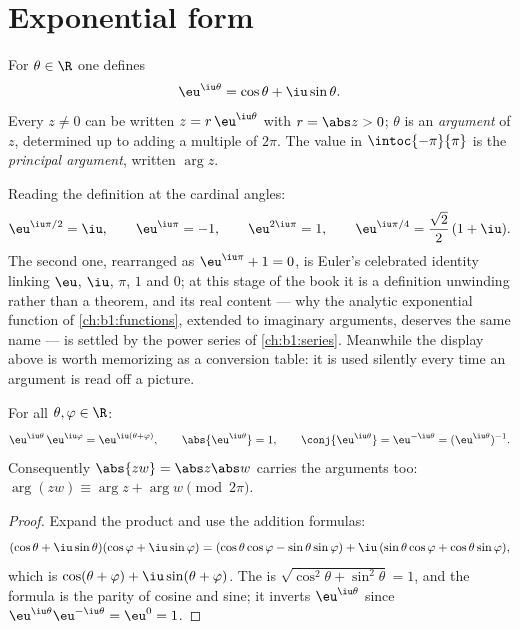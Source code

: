 \section{Exponential form}

\begin{definition}\label{def:b1:complex:expi}
For $\theta \in \R$ one defines
\[
\eu^{\iu\theta} = \cos\theta + \iu \sin\theta .
\]
Every $z \neq 0$ can be written $z = r\,\eu^{\iu\theta}$ with $r =
\abs z > 0$; $\theta$ is an \emph{argument} of $z$,
determined up to adding a multiple of $2\pi$. The value in
$\intoc{-\pi}{\pi}$ is the \emph{principal argument}, written
$\arg z$.
\end{definition}

\begin{example}\label{ex:b1:complex:eulerid}
Reading the definition at the cardinal angles:
\[
\eu^{\iu\pi/2} = \iu, \qquad
\eu^{\iu\pi} = -1, \qquad
\eu^{2\iu\pi} = 1, \qquad
\eu^{\iu\pi/4} = \frac{\sqrt2}2\,(1 + \iu) .
\]
The second one, rearranged as $\eu^{\iu\pi} + 1 = 0$, is Euler's
celebrated identity linking $\eu$, $\iu$, $\pi$, $1$ and $0$; at
this stage of the book it is a definition unwinding rather than a
theorem, and its real content --- why the analytic exponential
function of \cref{ch:b1:functions}, extended to imaginary
arguments, deserves the same name --- is settled by the power
series of \cref{ch:b1:series}. Meanwhile the display above is
worth memorizing as a conversion table: it is used silently every
time an argument is read off a picture.
\end{example}

\begin{theorem}\label{thm:b1:complex:funceq}
For all $\theta, \varphi \in \R$:
\[
\eu^{\iu\theta}\, \eu^{\iu\varphi} = \eu^{\iu(\theta + \varphi)},
\qquad
\abs{\eu^{\iu\theta}} = 1,
\qquad
\conj{\eu^{\iu\theta}} = \eu^{-\iu\theta} = (\eu^{\iu\theta})^{-1}.
\]
Consequently $\abs{zw} = \abs z \abs w$ carries the arguments too:
$\arg(zw) \equiv \arg z + \arg w \pmod{2\pi}$.
\end{theorem}

\begin{proof}
Expand the product and use the addition formulas:
\[
(\cos\theta + \iu\sin\theta)(\cos\varphi + \iu\sin\varphi)
= (\cos\theta\cos\varphi - \sin\theta\sin\varphi)
+ \iu\,(\sin\theta\cos\varphi + \cos\theta\sin\varphi),
\]
which is $\cos(\theta+\varphi) + \iu\sin(\theta+\varphi)$. The 
is $\sqrt{\cos^2\theta + \sin^2\theta} = 1$, and the  formula
is the parity of cosine and sine; it inverts $\eu^{\iu\theta}$ since
$\eu^{\iu\theta}\eu^{-\iu\theta} = \eu^0 = 1$.
\end{proof}

